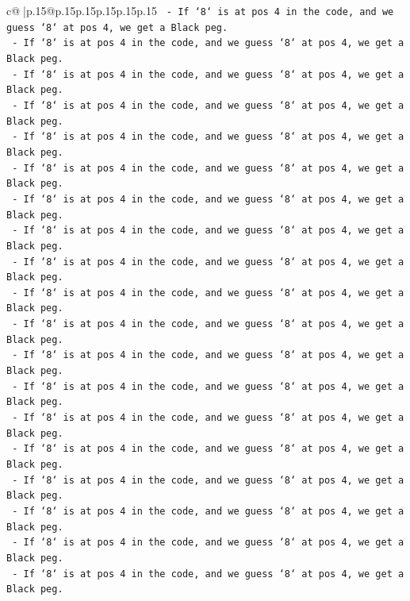 \documentclass{article}
\begin{document}
{\begin{supertabular}{c@{$\;$}|p{.15\linewidth}@{}p{.15\linewidth}p{.15\linewidth}p{.15\linewidth}p{.15\linewidth}p{.15\linewidth}}
{{{\texttt{    {-} If `8` is at pos 4 in the code, and we guess `8` at pos 4, we get a Black peg.} \\
\texttt{    {-} If `8` is at pos 4 in the code, and we guess `8` at pos 4, we get a Black peg.} \\
\texttt{    {-} If `8` is at pos 4 in the code, and we guess `8` at pos 4, we get a Black peg.} \\
\texttt{    {-} If `8` is at pos 4 in the code, and we guess `8` at pos 4, we get a Black peg.} \\
\texttt{    {-} If `8` is at pos 4 in the code, and we guess `8` at pos 4, we get a Black peg.} \\
\texttt{    {-} If `8` is at pos 4 in the code, and we guess `8` at pos 4, we get a Black peg.} \\
\texttt{    {-} If `8` is at pos 4 in the code, and we guess `8` at pos 4, we get a Black peg.} \\
\texttt{    {-} If `8` is at pos 4 in the code, and we guess `8` at pos 4, we get a Black peg.} \\
\texttt{    {-} If `8` is at pos 4 in the code, and we guess `8` at pos 4, we get a Black peg.} \\
\texttt{    {-} If `8` is at pos 4 in the code, and we guess `8` at pos 4, we get a Black peg.} \\
\texttt{    {-} If `8` is at pos 4 in the code, and we guess `8` at pos 4, we get a Black peg.} \\
\texttt{    {-} If `8` is at pos 4 in the code, and we guess `8` at pos 4, we get a Black peg.} \\
\texttt{    {-} If `8` is at pos 4 in the code, and we guess `8` at pos 4, we get a Black peg.} \\
\texttt{    {-} If `8` is at pos 4 in the code, and we guess `8` at pos 4, we get a Black peg.} \\
\texttt{    {-} If `8` is at pos 4 in the code, and we guess `8` at pos 4, we get a Black peg.} \\
\texttt{    {-} If `8` is at pos 4 in the code, and we guess `8` at pos 4, we get a Black peg.} \\
\texttt{    {-} If `8` is at pos 4 in the code, and we guess `8` at pos 4, we get a Black peg.} \\
\texttt{    {-} If `8` is at pos 4 in the code, and we guess `8` at pos 4, we get a Black peg.} \\
\texttt{    {-} If `8` is at pos 4 in the code, and we guess `8` at pos 4, we get a Black peg.} \\
}}}
\end{supertabular}}
\end{document}

